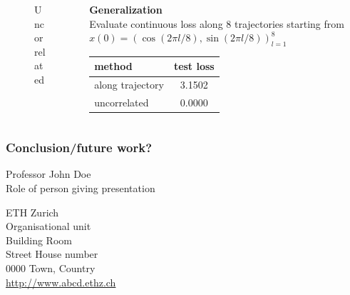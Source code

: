 \documentclass[11pt,aspectratio=169]{beamer}
\begin{document}
\begin{frame}
\begin{columns}[T]
\begin{column}{0.3\textwidth}
\begin{figure}[h!]
                 \caption{Uncorrelated}
             \end{figure}
        \end{column}
        \begin{column}[T]{0.4\textwidth}
        \textbf{Generalization}\\
        Evaluate continuous loss along 8 trajectories starting from
        $x(0)=(\cos(2\pi l/8), \sin(2\pi l/8))_{l=1}^8$
            \begin{center}
                \begin{tabular}{ l | c }
 method& test loss\\
 \hline
  along trajectory& 3.1502\\
  uncorrelated& 0.0000
\end{tabular}
            \end{center}
        \end{column}
    \end{columns}
\end{frame}

\begin{frame}
    \frametitle{Conclusion/future work?}
\end{frame}

\begin{closingframe}

Professor John Doe\\
Role of person giving presentation\\

\medskip

ETH Zurich\\
Organisational unit\\
Building Room\\
Street House number\\
0000 Town, Country\\
\url{http://www.abcd.ethz.ch}

\end{closingframe}


\end{document}
